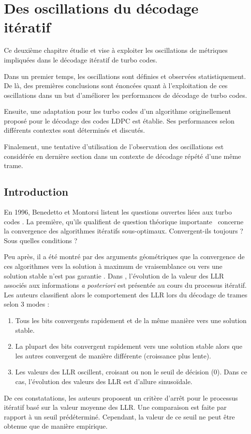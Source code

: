 \chapter{Des oscillations du décodage itératif} %
Ce deuxième chapitre étudie et vise à exploiter les oscillations de métriques impliquées dans le décodage itératif de turbo codes. 

Dans un premier temps, les oscillations sont définies et observées statistiquement. De là, des premières conclusions sont
énoncées quant à l'exploitation de ces oscillations dans un but d'améliorer les performances de décodage de turbo codes.

Ensuite, une adaptation pour les turbo codes d'un algorithme originellement proposé pour le décodage des codes LDPC est 
établie. Ses performances selon différents contextes sont déterminés et discutés.

Finalement, une tentative d'utilisation de l'observation des oscillations est considérée en dernière section dans un 
contexte de décodage répété d'une même trame.

\vspace*{\fill}
\minitocTITI
\vspace*{\fill}
\newpage

\section{Introduction}\label{sec:ch2_intro} 
En 1996, Benedetto et Montorsi listent les questions ouvertes liées aux turbo codes \cite{benedetto_unveiling}. La
première, qu'ils qualifient de \og question théorique importante \fg ~concerne la convergence des algorithmes itératifs 
sous-optimaux. \og Convergent-ils toujours ? Sous quelles conditions ? \fg

Peu après, il a été montré par des arguments géométriques que la convergence de ces algorithmes vers la solution à 
maximum de vraisemblance ou vers une solution stable n'est pas garantie \cite{richardson_geometry}.
Dans \cite{reid_convergence}, l'évolution de la valeur des LLR associés aux informations \textit{a posteriori} est présentée au 
cours du processus itératif. Les auteurs classifient alors le comportement des LLR lors du décodage de trames selon 3 modes : 
\begin{enumerate}
	\item Tous les bits convergents rapidement et de la même manière vers une solution stable.
	\item La plupart des bits convergent rapidement vers une solution stable alors que les autres convergent de manière 
	différente (croissance plus lente).
	\item Les valeurs des LLR oscillent, croisant ou non le seuil de décision (0). Dans ce cas, l'évolution
	des valeurs des LLR est d'allure sinusoïdale.
\end{enumerate}
De ces constatations, les auteurs proposent un critère d'arrêt pour le processus itératif basé sur la valeur moyenne des 
LLR. Une comparaison est faite par rapport à un seuil prédéterminé. Cependant, la valeur de ce seuil ne peut être 
obtenue que de manière empirique. %

